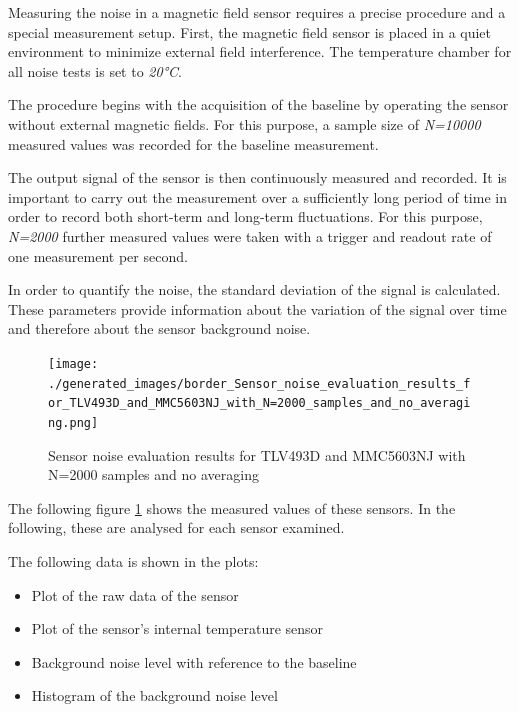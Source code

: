 Measuring the noise in a magnetic field sensor requires a precise
procedure and a special measurement setup. First, the magnetic field
sensor is placed in a quiet environment to minimize external field
interference. The temperature chamber for all noise tests is set to
\emph{20°C}.

The procedure begins with the acquisition of the baseline by operating
the sensor without external magnetic fields. For this purpose, a sample
size of \emph{N=10000} measured values was recorded for the baseline
measurement.

The output signal of the sensor is then continuously measured and
recorded. It is important to carry out the measurement over a
sufficiently long period of time in order to record both short-term and
long-term fluctuations. For this purpose, \emph{N=2000} further measured
values were taken with a trigger and readout rate of one measurement per
second.

In order to quantify the noise, the standard deviation of the signal is
calculated. These parameters provide information about the variation of
the signal over time and therefore about the sensor background noise.

\begin{figure}
\centering
\texttt{[image: ./generated\_images/border\_Sensor\_noise\_evaluation\_results\_for\_TLV493D\_and\_MMC5603NJ\_with\_N=2000\_samples\_and\_no\_averaging.png]}
\caption{Sensor noise evaluation results for TLV493D and MMC5603NJ with
N=2000 samples and no averaging
\label{Sensor_noise_evaluation_results_for_TLV493D_and_MMC5603NJ_with_N=2000_samples_and_no_averaging.png}}
\end{figure}

The following figure
\ref{Sensor_noise_evaluation_results_for_TLV493D_and_MMC5603NJ_with_N=2000_samples_and_no_averaging.png}
shows the measured values of these sensors. In the following, these are
analysed for each sensor examined.

The following data is shown in the plots:

\begin{itemize}
\tightlist
\item
  Plot of the raw data of the sensor
\item
  Plot of the sensor's internal temperature sensor
\item
  Background noise level with reference to the baseline
\item
  Histogram of the background noise level
\end{itemize}

